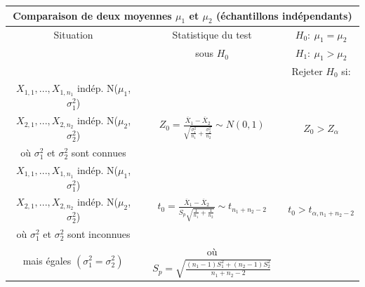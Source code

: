 \documentclass [12pt]{article}
\begin{document}
\newpage
\vspace*{-0.4in}
\begin{center}
\begin{tabular}{|c|c|c|}
\hline
\multicolumn{3}{|c|}{{\bf Comparaison de deux moyennes $\mu_{1}$ et
$\mu_{2}$ (échantillons indépendants)}}
\\
\hline Situation & Statistique du test & $H_{0}:\ \mu_{1} =
\mu_{2}$
\\
& sous $H_{0}$
& $H_{1}:\  \mu_{1} > \mu_{2}$
\\
&
& Rejeter $H_{0}$ si:
\\
\hline
\hline
 $X_{1,1}, ..., X_{1,n_1}$ indép. N($\mu_1$, $\sigma^2_1$) &&\\
 $X_{2,1}, ..., X_{2,n_2}$ indép. N($\mu_2$, $\sigma^2_2$) & $\displaystyle Z_0 =
\frac{\overline X_1 -\overline X_2}{\sqrt{\frac{\sigma_1^2}{n_1} +
\frac{\sigma^2_2}{n_2}}} \sim N(0,1)$ & $Z_0 > Z_{\alpha}$
\\
où $\sigma_{1}^{2}$ et $\sigma_{2}^{2}$ sont connues& &
\\
\hline
$X_{1,1}, ..., X_{1,n_1}$ indép. N($\mu_1$, $\sigma^2_1$)& & \\
$X_{2,1}, ..., X_{2,n_2}$ indép. N($\mu_2$, $\sigma^2_2$)&
$\displaystyle t_0 = \frac{\overline X_1 -\overline X_2}{S_p
\sqrt{\frac{1}{n_1} + \frac{1}{n_2}}} \sim t_{n_1+n_2-2}$ & $t_0 >
t_{\alpha,n_1+n_2-2}$
\\
où $\sigma_{1}^{2}$ et $\sigma_{2}^{2}$ sont inconnues
 & &
\\
mais égales $(\sigma_{1}^{2}=\sigma_{2}^{2})$ & où $S_p =
\sqrt{\displaystyle\frac{(n_1-1)S_1^2 + (n_2-1)S_2^2}{n_1 + n_2
-2}}$ &
\\

\hline
\end{tabular}
\end{center}
\end{document}
